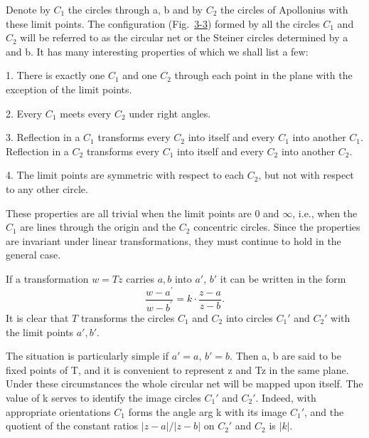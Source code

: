 Denote by $C_{1}$ the circles through a, b and by $C_{2}$ the circles of Apollonius with these limit points. The configuration (Fig.~\hyperref[fig:3-3]{3-3}) formed by all the circles $C_{1}$ and $C_{2}$ will be referred to as the circular net or the Steiner circles determined by a and b. It has many interesting properties of which we shall list a few:

1. There is exactly one $C_{1}$ and one $C_{2}$ through each point in the plane with the exception of the limit points.

2. Every $C_1$ meets every $C_2$ under right angles.

3. Reflection in a $C_{1}$ transforms every $C_{2}$ into itself and every $C_{1}$ into another $C_{1}$. Reflection in a $C_{2}$ transforms every $C_{1}$ into itself and every $C_{2}$ into another $C_{2}$.

4. The limit points are symmetric with respect to each $C_{2}$, but not with respect to any other circle.


These properties are all trivial when the limit points are 0 and $\infty$, i.e., when the $C_{1}$ are lines through the origin and the $C_{2}$ concentric circles. Since the properties are invariant under linear transformations, they must continue to hold in the general case.

If a transformation $w = Tz$ carries $a, b$ into $a'$, $b'$ it can be written in the form
\begin{equation*}
\frac {w - a ^ {\prime}}{w - b ^ {\prime}} = k \cdot \frac {z - a}{z - b}.\tag{12}\label{eq:3.12}
\end{equation*}
It is clear that $T$ transforms the circles $C_1$ and $C_2$ into circles $C_1'$ and $C_2'$ with the limit points $a', b'$.

The situation is particularly simple if $a' = a$, $b' = b$. Then a, b are said to be fixed points of T, and it is convenient to represent z and Tz in the same plane. Under these circumstances the whole circular net will be mapped upon itself. The value of k serves to identify the image circles $C_{1}'$ and $C_{2}'$. Indeed, with appropriate orientations $C_{1}$ forms the angle arg k with its image $C_{1}'$, and the quotient of the constant ratios $|z - a|/|z - b|$ on $C_{2}'$ and $C_{2}$ is $|k|$.

